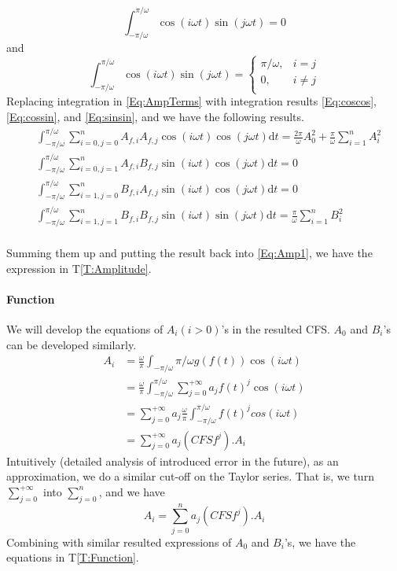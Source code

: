 \documentclass[12pt]{article}
\newcommand{\tref}[1]{T\ref{#1}}
\begin{document}
\begin{equation}\label{Eq:cossin}
\int_{-\pi/\omega}^{\pi/\omega}\cos(i\omega t)\sin(j\omega t)=0
\end{equation}
and
\begin{equation}\label{Eq:sinsin}
\int_{-\pi/\omega}^{\pi/\omega}\cos(i\omega t)\sin(j\omega t)=\begin{cases}
\pi/\omega, &i=j\\
0, &i\neq j\\
\end{cases}
\end{equation}
Replacing integration in \autoref{Eq:AmpTerms} 
with integration results \autoref{Eq:coscos}, 
\autoref{Eq:cossin}, and \autoref{Eq:sinsin}, and we have the following results.
\begin{equation}\label{Eq:AmpTermsResult}
\begin{aligned}
&\int_{-\pi/\omega}^{\pi/\omega}\sum_{i=0,j=0}^{n}A_{f,i}A_{f,j}
\cos(i\omega t)\cos(j\omega t)\text{d} t
=\frac{2\pi}{\omega}A_0^2+\frac{\pi}{\omega}\sum_{i=1}^{n}A_i^2\\
&\int_{-\pi/\omega}^{\pi/\omega}\sum_{i=0,j=1}^{n}A_{f,i}B_{f,j}
\sin(i\omega t)\cos(j\omega t)\text{d} t
=0\\
&\int_{-\pi/\omega}^{\pi/\omega}\sum_{i=1,j=0}^{n}B_{f,i}A_{f,j}
\sin(i\omega t)\cos(j\omega t)\text{d} t
=0\\
&\int_{-\pi/\omega}^{\pi/\omega}\sum_{i=1,j=1}^{n}B_{f,i}B_{f,j}
\sin(i\omega t)\sin(j\omega t)\text{d} t
=\frac{\pi}{\omega}\sum_{i=1}^{n}B_i^2\\
\end{aligned}
\end{equation}

Summing them up and putting the result back into 
\autoref{Eq:Amp1}, we have the expression 
in \tref{T:Amplitude}.
\paragraph{Function}
We will develop the equations of $A_i(i>0)$'s in the resulted CFS. $A_0$ and $B_i$'s can be developed similarly.
\begin{align}
	A_i&=\frac{\omega}{\pi}\int_{-\pi/\omega}{\pi/\omega}g(f(t))\cos(i\omega t)\\
	&=\frac{\omega}{\pi}\int_{-\pi/\omega}^{\pi/\omega}\sum_{j=0}^{+\infty}a_jf(t)^j\cos(i\omega t)\\
	&=\sum_{j=0}^{+\infty}a_j\frac{\omega}{\pi}\int_{-\pi/\omega}^{\pi/\omega}f(t)^jcos(i\omega t)\\
	&=\sum_{j=0}^{+\infty}a_j(\mathit{CFSf}^j).A_i
\end{align}
Intuitively (detailed analysis of introduced error in the future), as an approximation, we do a similar cut-off on the Taylor series. That is, we turn $\sum_{j=0}^{+\infty}$ into $\sum_{j=0}^{n}$, and we have
\begin{equation}
	A_i=\sum_{j=0}^{n}a_j(\mathit{CFSf}^j).A_i
\end{equation}
Combining with similar resulted expressions of $A_0$ and $B_i$'s, we have the equations in \tref{T:Function}.
\end{document}
